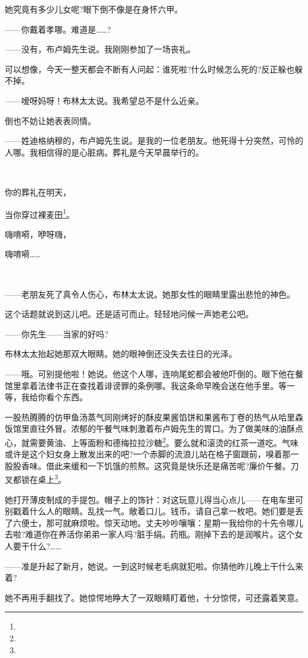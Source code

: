 \par 她究竟有多少儿女呢?眼下倒不像是在身怀六甲。
\par ——你戴着孝哪。难道是……?
\par ——没有，布卢姆先生说。我刚刚参加了一场丧礼。
\par 可以想像，今天一整天都会不断有人问起：谁死啦?什么时候怎么死的?反正躲也躲不掉。
\par ——嗳呀妈呀！布林太太说。我希望总不是什么近亲。
\par 倒也不妨让她表表同情。
\par ——姓迪格纳穆的，布卢姆先生说。是我的一位老朋友。他死得十分突然，可怜的人哪。我相信得的是心脏病。葬礼是今天早晨举行的。
\par  
\par 你的葬礼在明天，
\par 当你穿过裸麦田\footnote{}。
\par 嗨唷嗬，咿呀嗨，
\par 嗨唷嗬……
\par  
\par ——老朋友死了真令人伤心，布林太太说。她那女性的眼睛里露出悲怆的神色。
\par 这个话题就说到这儿吧。还是适可而止。轻轻地问候一声她老公吧。
\par ——你先生——当家的好吗?
\par 布林太太抬起她那双大眼睛。她的眼神倒还没失去往日的光泽。
\par ——哦。可别提他啦！她说。他这个人哪，连响尾蛇都会被他吓倒的。眼下他在餐馆里拿着法律书正在查找着诽谤罪的条例哪。我这条命早晚会送在他手里。等一等，我给你看个东西。
\par 一股热腾腾的仿甲鱼汤蒸气同刚烤好的酥皮果酱馅饼和果酱布丁卷的热气从哈里森饭馆里直往外冒。浓郁的午餐气味刺激着布卢姆先生的胃口。为了做美味的油酥点心，就需要黄油、上等面粉和德梅拉拉沙糖\footnote{}。要么就和滚烫的红茶一道吃。气味或许是这个妇女身上散发出来的吧?一个赤脚的流浪儿站在格子窗跟前，嗅着那一股股香味。借此来缓和一下饥饿的煎熬。这究竟是快乐还是痛苦呢?廉价午餐。刀叉都锁在桌上\footnote{}。
\par 她打开薄皮制成的手提包。帽子上的饰针：对这玩意儿得当心点儿——在电车里可别戳着什么人的眼睛。乱找一气。敞着口儿。钱币。请自己拿一枚吧。她们要是丢了六便士，那可就麻烦啦。惊天动地。丈夫吵吵嚷嚷：星期一我给你的十先令哪儿去啦?难道你在养活你弟弟一家人吗?脏手绢。药瓶。刚掉下去的是润喉片。这个女人要干什么?……
\par ——准是升起了新月，她说。一到这时候老毛病就犯啦。你猜他昨儿晚上干什么来着?
\par 她不再用手翻找了。她惊愕地睁大了一双眼睛盯着他，十分惊愕，可还露着笑意。

